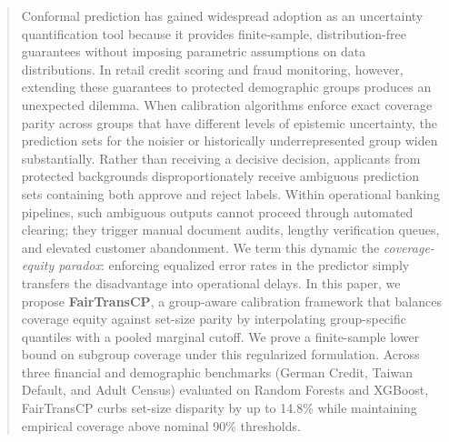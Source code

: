 \documentclass[twoside]{article}
\begin{document}

\begin{abstract}
Conformal prediction has gained widespread adoption as an uncertainty quantification tool because it provides finite-sample, distribution-free guarantees without imposing parametric assumptions on data distributions. In retail credit scoring and fraud monitoring, however, extending these guarantees to protected demographic groups produces an unexpected dilemma. When calibration algorithms enforce exact coverage parity across groups that have different levels of epistemic uncertainty, the prediction sets for the noisier or historically underrepresented group widen substantially. Rather than receiving a decisive decision, applicants from protected backgrounds disproportionately receive ambiguous prediction sets containing both approve and reject labels. Within operational banking pipelines, such ambiguous outputs cannot proceed through automated clearing; they trigger manual document audits, lengthy verification queues, and elevated customer abandonment. We term this dynamic the \emph{coverage-equity paradox}: enforcing equalized error rates in the predictor simply transfers the disadvantage into operational delays. In this paper, we propose \textbf{FairTransCP}, a group-aware calibration framework that balances coverage equity against set-size parity by interpolating group-specific quantiles with a pooled marginal cutoff. We prove a finite-sample lower bound on subgroup coverage under this regularized formulation. Across three financial and demographic benchmarks (German Credit, Taiwan Default, and Adult Census) evaluated on Random Forests and XGBoost, FairTransCP curbs set-size disparity by up to 14.8\% while maintaining empirical coverage above nominal 90\% thresholds.
\end{abstract}
\end{document}
